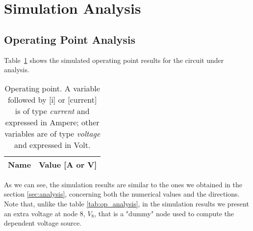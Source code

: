 \section{Simulation Analysis}
\label{sec:simulation}

\subsection{Operating Point Analysis}

\par Table~\ref{tab:op_sim} shows the simulated operating point results for the circuit
under analysis.
\begin{table}[H]
  \centering
  \begin{tabular}{|l|r|}
    \hline    
    {\bf Name} & {\bf Value [A or V]} \\ \hline
    
  \end{tabular}
  \caption{Operating point. A variable followed by [i] or [current] is of type {\em current}
    and expressed in Ampere; other variables are of type {\it voltage} and expressed in
    Volt.}
  \label{tab:op_sim}
\end{table}

\par  As we can see, the simulation results are similar to the ones we obtained in the section \ref{sec:analysis}, concerning both the numerical values and the directions. Note that, unlike the table \ref{tab:op_analysis}, in the simulation results we present an extra voltage at node 8, $V_8$, that is a "dummy" node used to compute the dependent voltage source.



